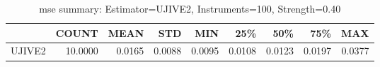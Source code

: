 \begin{table}[ht]
\centering
\caption{mse summary: Estimator=UJIVE2, Instruments=100, Strength=0.40}
\begin{tabular}{lrrrrrrrr}
\toprule
 & COUNT & MEAN & STD & MIN & 25\% & 50\% & 75\% & MAX \\
\midrule
UJIVE2 & 10.0000 & 0.0165 & 0.0088 & 0.0095 & 0.0108 & 0.0123 & 0.0197 & 0.0377 \\
\bottomrule
\end{tabular}
\end{table}
